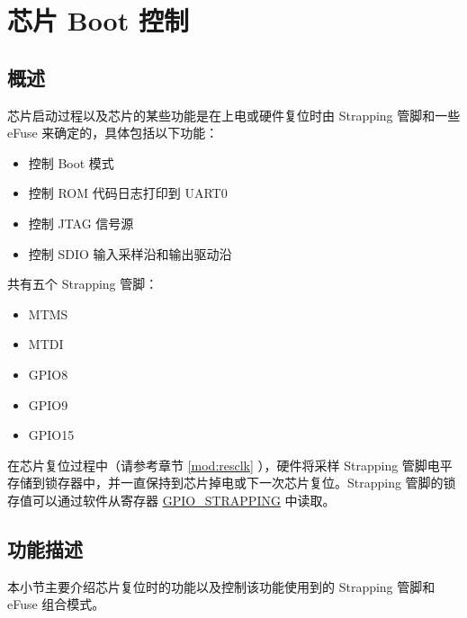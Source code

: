 \documentclass[main\_\_CN.tex]{subfiles}
\begin{document}

\ifglobal
\else
    {\let\clearpage\relax \listoftodos}
    {\let\clearpage\relax \listofdonetodos}
    \tableofcontents
\fi



\hypertarget{bootctrl}{}
\chapter{芯片 Boot 控制}
\label{mod:bootctrl}

\section{概述}

芯片启动过程以及芯片的某些功能是在上电或硬件复位时由 Strapping 管脚和一些 eFuse 来确定的，具体包括以下功能：

\begin{itemize}
    \item 控制 Boot 模式
    \item 控制 ROM 代码日志打印到 UART0
    \item 控制 JTAG 信号源
    \item 控制 SDIO 输入采样沿和输出驱动沿
\end{itemize}

\chipname{} 共有五个 Strapping 管脚：
\begin{itemize}
    \item MTMS
    \item MTDI
    \item GPIO8
    \item GPIO9
    \item GPIO15
\end{itemize}


在芯片复位过程中（请参考章节 \ref{mod:resclk} \textit{}），硬件将采样 Strapping 管脚电平存储到锁存器中，并一直保持到芯片掉电或下一次芯片复位。Strapping 管脚的锁存值可以通过软件从寄存器 \hyperref[fielddesc:GPIOSTRAPPING]{GPIO\_STRAPPING} 中读取。


\section{功能描述}
本小节主要介绍芯片复位时的功能以及控制该功能使用到的 Strapping 管脚和 eFuse 组合模式。
\end{document}
